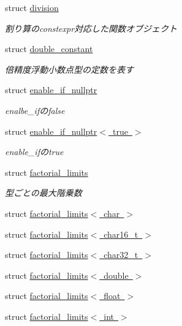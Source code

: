 \begin{DoxyCompactItemize}
struct \mbox{\hyperlink{structsaki_1_1division}{division}}
\begin{DoxyCompactList}\small\item\em 割り算のconstexpr対応した関数オブジェクト \end{DoxyCompactList}\item 
struct \mbox{\hyperlink{structsaki_1_1double__constant}{double\+\_\+constant}}
\begin{DoxyCompactList}\small\item\em 倍精度浮動小数点型の定数を表す \end{DoxyCompactList}\item 
struct \mbox{\hyperlink{structsaki_1_1enable__if__nullptr}{enable\+\_\+if\+\_\+nullptr}}
\begin{DoxyCompactList}\small\item\em enalbe\+\_\+ifのfalse \end{DoxyCompactList}\item 
struct \mbox{\hyperlink{structsaki_1_1enable__if__nullptr_3_01true_01_4}{enable\+\_\+if\+\_\+nullptr$<$ true $>$}}
\begin{DoxyCompactList}\small\item\em enable\+\_\+ifのtrue \end{DoxyCompactList}\item 
struct \mbox{\hyperlink{structsaki_1_1factorial__limits}{factorial\+\_\+limits}}
\begin{DoxyCompactList}\small\item\em 型ごとの最大階乗数 \end{DoxyCompactList}\item 
struct \mbox{\hyperlink{structsaki_1_1factorial__limits_3_01char_01_4}{factorial\+\_\+limits$<$ char $>$}}
\item 
struct \mbox{\hyperlink{structsaki_1_1factorial__limits_3_01char16__t_01_4}{factorial\+\_\+limits$<$ char16\+\_\+t $>$}}
\item 
struct \mbox{\hyperlink{structsaki_1_1factorial__limits_3_01char32__t_01_4}{factorial\+\_\+limits$<$ char32\+\_\+t $>$}}
\item 
struct \mbox{\hyperlink{structsaki_1_1factorial__limits_3_01double_01_4}{factorial\+\_\+limits$<$ double $>$}}
\item 
struct \mbox{\hyperlink{structsaki_1_1factorial__limits_3_01float_01_4}{factorial\+\_\+limits$<$ float $>$}}
\item 
struct \mbox{\hyperlink{structsaki_1_1factorial__limits_3_01int_01_4}{factorial\+\_\+limits$<$ int $>$}}
\item 

\end{DoxyCompactItemize}
